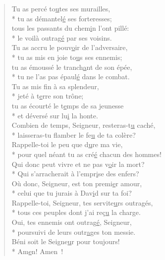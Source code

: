\begin{verse}
Tu as percé to\underline{u}tes ses murailles, \\*
tu as démantel\underline{é} ses forteresses; \\
tous les passants du chem\underline{i}n l’ont pillé: \\*
le voilà outrag\underline{é} par ses voisins. \\

Tu as accru le pouv\underline{o}ir de l’adversaire, \\*
tu as mis en joie to\underline{u}s ses ennemis; \\
tu as émoussé le tranch\underline{a}nt de son épée, \\*
tu ne l’as pas épaul\underline{é} dans le combat. \\

Tu as mis f\underline{i}n à sa splendeur, \\*
jeté à t\underline{e}rre son trône; \\
tu as écourté le t\underline{e}mps de sa jeunesse \\*
et déversé sur lu\underline{i} la honte. \\

Combien de temps, Seigneur, resteras-t\underline{u} caché, \\*
laisseras-tu flamber le fe\underline{u} de ta colère? \\

Rappelle-toi le peu que d\underline{u}re ma vie, \\*
pour quel néant tu as cré\underline{é} chacun des hommes! \\
Qui donc peut vivre et ne pas v\underline{o}ir la mort? \\*
Qui s’arracherait à l’empr\underline{i}se des enfers? \\

Où donc, Seigneur, est ton premi\underline{e}r amour, \\*
celui que tu jurais à Dav\underline{i}d sur ta foi? \\

Rappelle-toi, Seigneur, tes servite\underline{u}rs outragés, \\*
tous ces peuples dont j’ai reç\underline{u} la charge. \\
Oui, tes ennemis ont outrag\underline{é}, Seigneur, \\*
poursuivi de leurs outr\underline{a}ges ton messie. \\

Béni soit le Seigne\underline{u}r pour toujours! \\*
Am\underline{e}n! Amen ! \\
\end{verse}

